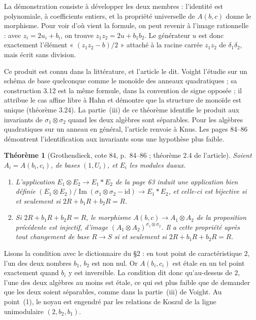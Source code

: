 \documentclass[11pt,a4paper]{amsart}
\theoremstyle{definition}
\theoremstyle{plain}
\newtheorem{theoreme}{Théorème}
\theoremstyle{remark}
\theoremstyle{plain}
\begin{document}
La démonstration consiste à développer les deux membres : l'identité est polynomiale, à coefficients entiers, et la propriété universelle de $A(b, c)$ donne le morphisme. Pour voir d'où vient la formule, on peut revenir à l'image rationnelle : avec $z_i = 2u_i + b_i$, on trouve $z_1z_2 = 2u + b_1b_2$. Le générateur $u$ est donc exactement l'élément « $(z_1z_2 - b)/2$ » attaché à la racine carrée $z_1z_2$ de $\delta_1\delta_2$, mais écrit sans division.

Ce produit est connu dans la littérature, et l'article le dit. Voight l'étudie sur un schéma de base quelconque comme le monoïde des anneaux quadratiques ; sa construction 3.12 est la même formule, dans la convention de signe opposée ; il attribue le cas affine libre à Hahn et démontre que la structure de monoïde est unique (théorème 3.24). La partie~(iii) de ce théorème identifie le produit aux invariants de $\sigma_1\otimes\sigma_2$ quand les deux algèbres sont séparables. Pour les algèbres quadratiques sur un anneau en général, l'article renvoie à Knus. Les pages 84--86 démontrent l'identification aux invariants sous une hypothèse plus faible.

\begin{theoreme}[Grothendieck, cote 84, p.~84--86 ; théorème 2.4 de l'article]
Soient $A_i = A(b_i, c_i)$, de bases $(1, U_i)$, et $E_i$ les modules duaux.
\begin{enumerate}
\item L'application $E_1\otimes E_2 \to E_1 * E_2$ de la page 63 induit une application bien définie $(E_1\otimes E_2)/\operatorname{Im}(\sigma_1\otimes\sigma_2 - \mathrm{id}) \to E_1 * E_2$, et celle-ci est bijective si et seulement si $2R + b_1R + b_2R = R$.
\item Si $2R + b_1R + b_2R = R$, le morphisme $A(b, c) \to A_1\otimes A_2$ de la proposition précédente est injectif, d'image $(A_1\otimes A_2)^{\sigma_1\otimes\sigma_2}$. Il a cette propriété après tout changement de base $R \to S$ si et seulement si $2R + b_1R + b_2R = R$.
\end{enumerate}
\end{theoreme}

Lisons la condition avec le dictionnaire du §2 : en tout point de caractéristique $2$, l'un des deux nombres $b_1$, $b_2$ est non nul. Or $A(b_i, c_i)$ est étale en un tel point exactement quand $b_i$ y est inversible. La condition dit donc qu'au-dessus de $2$, l'une des deux algèbres au moins est étale, ce qui est plus faible que de demander que les deux soient séparables, comme dans la partie~(iii) de Voight. Au point~(1), le noyau est engendré par les relations de Koszul de la ligne unimodulaire $(2, b_2, b_1)$.
\end{document}
